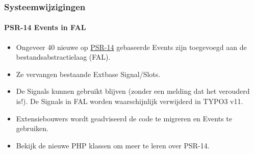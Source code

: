
\begin{frame}[fragile]
	\frametitle{Systeemwijzigingen}
	\framesubtitle{PSR-14 Events in FAL}

	\lstset{basicstyle=\tiny\ttfamily}

	\begin{itemize}
		\item Ongeveer 40 nieuwe op
			\href{https://www.php-fig.org/psr/psr-14/}{PSR-14}
			gebaseerde Events zijn toegevoegd aan de bestandsabstractielaag (FAL).
		\item Ze vervangen bestaande Extbase Signal/Slots.
		\item De Signals kunnen gebruikt blijven (zonder een melding dat het verouderd is!).
			De Signals in FAL worden waarschijnlijk verwijderd in TYPO3 v11.
		\item Extensiebouwers wordt geadviseerd de code te migreren en Events te gebruiken.
		\item Bekijk de nieuwe PHP klassen om meer te leren over PSR-14.
	\end{itemize}

\end{frame}



